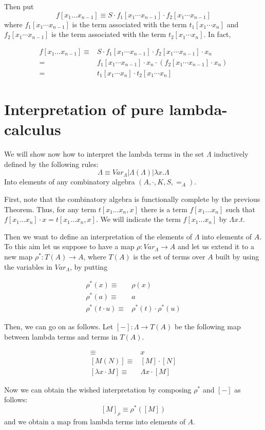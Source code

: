 \documentclass[a4paper,10pt]{article}
\begin{document}
\begin{itemize}
Then put $$ f[x_1 \dots x_{n-1}] \equiv S \cdot f_1[x_1 \cdots x_{n-1}] \cdot
f_2[x_1 \cdots x_{n-1}]$$ where $f_1[x_1 \cdots x_{n-1}]$ is the term
associated with the term $t_1[x_1 \cdots x_{n}]$ and $f_2[x_1 \cdots x_{n-1}]$
is the term associated with the term $t_2[x_1 \cdots x_{n}]$. In fact,

\begin{align*}
f[x_1 \dots x_{n-1}] \equiv & S \cdot f_1[x_1 \cdots x_{n-1}] \cdot f_2[x_1
\cdots x_{n-1}] \cdot x_n\\
= & f_1[x_1 \cdots x_{n-1}] \cdot x_n \cdot (f_2[x_1 \cdots x_{n-1}] \cdot
x_n)\\
= & t_1[x_1 \cdots x_{n}] \cdot t_2[x_1 \cdots x_{n}]
\end{align*}

\end{itemize}

\section{Interpretation of pure lambda-calculus}

We will show now how to interpret the lambda terms in the set $\Lambda$
inductively defined by the following rules:
$$\Lambda \equiv Var_\Lambda | \Lambda(\Lambda) | \lambda x . \Lambda$$
Into elements of any combinatory algebra $(A, \cdot, K, S, =_A)$.

First, note that the combinatory algebra is functionally complete by the
previous Theorem. Thus, for any term $t[x_1 \dots x_n, x]$ there is a term
$f[x_1 \dots x_n]$ such that $f[x_1 \dots x_n] \cdot x = t[x_1 \dots x_n, x]$.
We will indicate the term $f[x_1 \dots x_n]$ by $\Lambda x . t$.

Then we want to define an interpretation of the elements of $\Lambda$ into
elements of $A$. To this aim let us suppose to have a map $\rho : Var_\Lambda
\rightarrow A$ and let us extend it to a new map $\rho^* : T(A) \rightarrow A$,
where $T(A)$ is the set of terms over $A$ built by using the variables in
$Var_\Lambda$, by putting

\begin{align}
\rho^*(x) \equiv & \rho(x)\\
\rho^*(a) \equiv & a\\
\rho^*(t \cdot u) \equiv & \rho^*(t) \cdot \rho^*(u)
\end{align}

Then, we can go on as follows. Let $[-]:\Lambda \rightarrow T(A)$ be the
following map between lambda terms and terms in $T(A)$.

\begin{align}
[x] \equiv & x \\
[M(N)] \equiv & [M] \cdot [N] \\
[\lambda x \cdot M] \equiv & \Lambda x \cdot [M]
\end{align}

Now we can obtain the wished interpretation by composing $\rho^*$ and $[-]$ as
follows:
$$[M]_\rho \equiv \rho^*([M])$$
and we obtain a map from lambda terms into elements of $A$.
\end{document}
